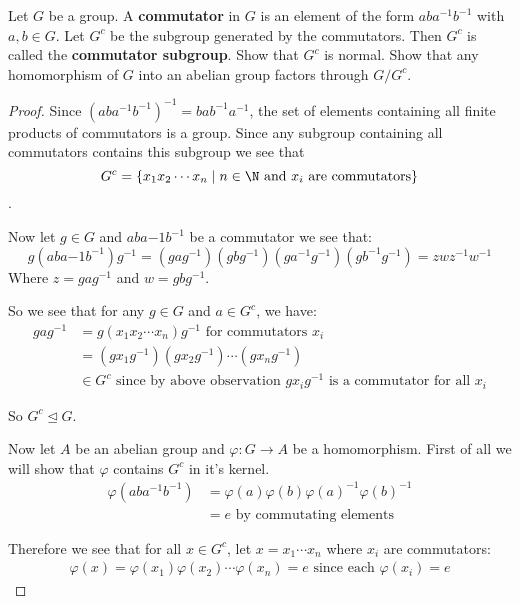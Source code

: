 \begin{exercise}
Let $G$ be a group. A \textbf{commutator} in $G$ is an element of the form $aba^{-1}b^{-1}$ with $a,b\in G$. Let $G^c$ be the subgroup generated by the commutators. Then $G^c$ is called the \textbf{commutator subgroup}. Show that $G^c$ is normal. Show that any homomorphism of $G$ into an abelian group factors through $G/G^c$.

\begin{proof}
Since ${(aba^{-1}b^{-1})}^{-1} = bab^{-1}a^{-1}$, the set of elements containing all finite products of commutators is a group. Since any subgroup containing all commutators contains this subgroup we see that 
\begin{equation}
    G^c = \{x_1x_2\cdots x_n \mid n\in \N \text{ and } x_i \text{ are commutators}\}
\end{equation}
.

Now let $g\in G$ and $aba{-1}b^{-1}$ be a commutator we see that:\begin{equation*}
g{(aba{-1}b^{-1})}g^{-1} = ({gag^{-1}})({gbg^{-1}})({ga^{-1}g^{-1}})({gb^{-1}g^{-1}}) = zwz^{-1}w^{-1} 
\end{equation*}
Where $z = gag^{-1}$ and $w = gbg^{-1}$.

So we see that for any $g\in G$ and $a\in G^c$, we have:\begin{align*}
gag^{-1} &= g(x_1x_2\cdots x_n)g^{-1} \text{ for commutators }x_i\\
&= (gx_1g^{-1})(gx_2g^{-1})\cdots (g{x_n}g^{-1})\\
&\in G^c \text{ since by above observation }gx_ig^{-1} \text{ is a commutator for all }x_i
\end{align*}

So $G^c\trianglelefteq G$.

Now let $A$ be an abelian group and $\varphi\colon G\rightarrow A$ be a homomorphism. First of all we will show that $\varphi$ contains $G^c$ in it's kernel.\begin{align*}
\varphi(aba^{-1}b^{-1}) &= \varphi(a)\varphi(b)\varphi(a)^{-1}\varphi(b)^{-1}\\
        &= e \text{ by commutating elements}
\end{align*}

Therefore we see that for all $x\in G^c$, let $x = x_1\cdots x_n$ where $x_i$ are commutators:\begin{align}
\varphi(x) = \varphi(x_1)\varphi(x_2)\cdots \varphi(x_n) = e \text{ since each }\varphi(x_i) = e
\end{align}


\end{proof}
\end{exercise}

